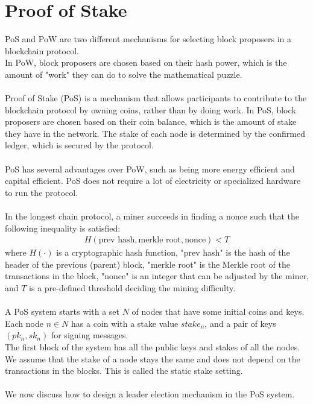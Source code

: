 \documentclass{report}
\begin{document}
\section{Proof of Stake}
PoS and PoW are two different mechanisms for selecting block proposers in a blockchain protocol.\\
In PoW, block proposers are chosen based on their hash power, which is the amount of "work" they can do to solve the mathematical puzzle.\\\\
Proof of Stake (PoS) is a mechanism that allows participants to contribute to the blockchain protocol by owning coins, rather than by doing work. In PoS, block proposers are chosen based on their coin balance, which is the amount of stake they have in the network. The stake of each node is determined by the confirmed ledger, which is secured by the protocol.\\\\
PoS has several advantages over PoW, such as being more energy efficient and capital efficient. PoS does not require a lot of electricity or specialized hardware to run the protocol.\\\\
In the longest chain protocol, a miner succeeds in finding a nonce such that the following inequality is satisfied:
\begin{align}
	H(\text{prev hash}, \text{merkle root}, \text{nonce}) < T
\end{align}
where $H(·)$ is a cryptographic hash function, "prev hash" is the hash of the header of the previous
(parent) block, "merkle root" is the Merkle root of the transactions in the block, "nonce" is an integer
that can be adjusted by the miner, and $T$ is a pre-defined threshold deciding the mining difficulty.\\\\
A PoS system starts with a set $N$ of nodes that have some initial coins and keys. Each node $n \in N$ has a coin with a stake value $stake_n$, and a pair of keys $(pk_n, sk_n) $ for signing messages.\\
The first block of the system has all the public keys and stakes of all the nodes. We assume that the stake of a node stays the same and does not depend on the transactions in the blocks. This is called the static stake setting.\\\\
We now discuss how to design a leader election mechanism in the PoS system.
\end{document}
